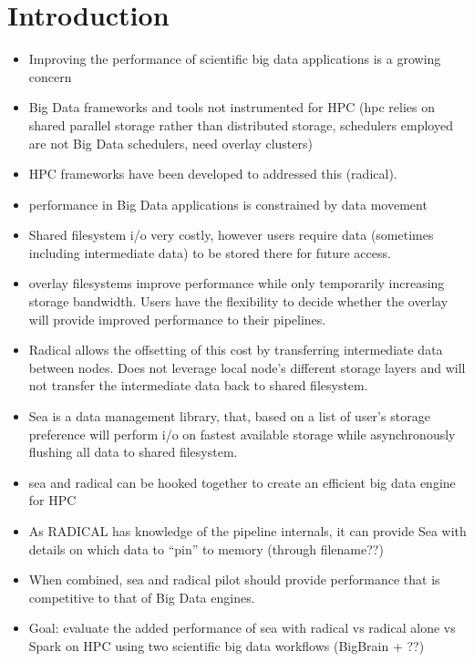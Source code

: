 \documentclass[conference]{IEEEtran}
\begin{document}
\section{Introduction}
\begin{itemize}
\item Improving the performance of scientific big data applications is a growing 
    concern
\item Big Data frameworks and tools not instrumented for HPC (hpc relies on 
    shared parallel storage rather than distributed storage, schedulers employed 
are not Big Data schedulers, need overlay clusters)
\item HPC frameworks have been developed to addressed this (radical).
\item performance in Big Data applications is constrained by data movement
\item Shared filesystem i/o very costly, however users require data (sometimes 
    including intermediate data) to be stored there for future access.
\item overlay filesystems improve performance while only temporarily increasing
    storage bandwidth. Users have the flexibility to decide whether the overlay
    will provide improved performance to their pipelines.
\item Radical allows the offsetting of this cost by transferring intermediate
    data between nodes. Does not leverage local node's different storage layers
    and will not transfer the intermediate data back to shared filesystem.
\item Sea is a data management library, that, based on a list of user's storage 
    preference will perform i/o on fastest available storage while 
    asynchronously flushing all data to shared filesystem.
\item sea and radical can be hooked together to create an efficient big data
    engine for HPC
\item As RADICAL has knowledge of the pipeline internals, it can provide Sea
    with details on which data to ``pin'' to memory (through filename??)
\item When combined, sea and radical pilot should provide performance that is
    competitive to that of Big Data engines.
\item Goal: evaluate the added performance of sea with radical vs radical alone 
    vs Spark on HPC using two scientific big data workflows (BigBrain + ??)
\end{itemize}
\end{document}
